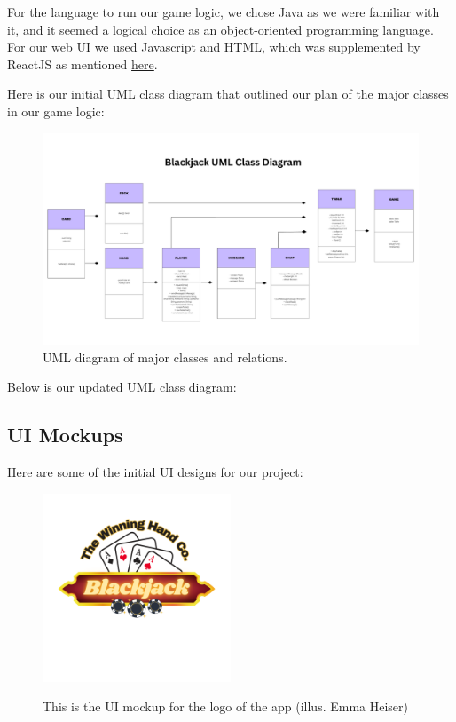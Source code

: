 For the language to run our game logic, we chose Java as we were familiar with it, and it seemed a logical choice as an object-oriented programming language. For our web UI we used Javascript and HTML, which was supplemented by ReactJS as mentioned \hyperref[sec:libs/mods/packs]{here}.

Here is our initial UML class diagram that outlined our plan of the major classes in our game logic:  

\begin{figure}[hbt!]
    \centering
    \includegraphics[width=0.8\linewidth]{figures/UML Diagram Whiteboard.pdf}
    \caption{UML diagram of major classes and relations.}
    \label{fig:UML}
\end{figure}

Below is our updated UML class diagram:

\pagebreak

\subsection{UI Mockups}
Here are some of the initial UI designs for our project:

\begin{figure}[hbt!]
    \centering
    \includegraphics[width=0.5\textwidth]{figures/Blackjack.png} \\
    \caption{This is the UI mockup for the logo of the app (illus. Emma Heiser)}
    \label{fig:logo}
\end{figure}

